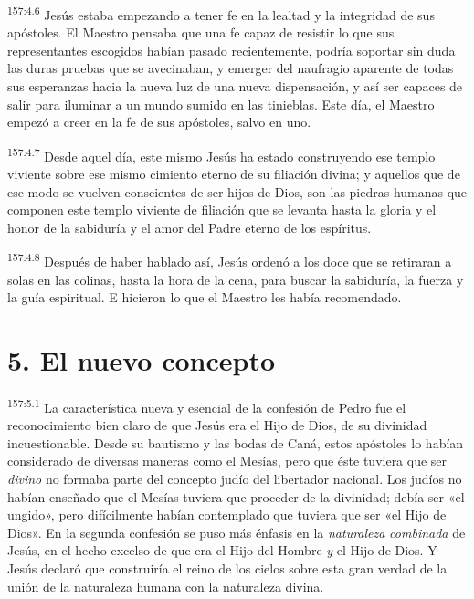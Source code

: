 \par 
\textsuperscript{157:4.6} Jesús estaba empezando a tener fe en la lealtad y la integridad de sus apóstoles. El Maestro pensaba que una fe capaz de resistir lo que sus representantes escogidos habían pasado recientemente, podría soportar sin duda las duras pruebas que se avecinaban, y emerger del naufragio aparente de todas sus esperanzas hacia la nueva luz de una nueva dispensación, y así ser capaces de salir para iluminar a un mundo sumido en las tinieblas. Este día, el Maestro empezó a creer en la fe de sus apóstoles, salvo en uno.

\par 
\textsuperscript{157:4.7} Desde aquel día, este mismo Jesús ha estado construyendo ese templo viviente sobre ese mismo cimiento eterno de su filiación divina; y aquellos que de ese modo se vuelven conscientes de ser hijos de Dios, son las piedras humanas que componen este templo viviente de filiación que se levanta hasta la gloria y el honor de la sabiduría y el amor del Padre eterno de los espíritus.

\par 
\textsuperscript{157:4.8} Después de haber hablado así, Jesús ordenó a los doce que se retiraran a solas en las colinas, hasta la hora de la cena, para buscar la sabiduría, la fuerza y la guía espiritual. E hicieron lo que el Maestro les había recomendado.

\section*{5. El nuevo concepto}
\par 
\textsuperscript{157:5.1} La característica nueva y esencial de la confesión de Pedro fue el reconocimiento bien claro de que Jesús era el Hijo de Dios, de su divinidad incuestionable. Desde su bautismo y las bodas de Caná, estos apóstoles lo habían considerado de diversas maneras como el Mesías, pero que éste tuviera que ser \textit{divino} no formaba parte del concepto judío del libertador nacional. Los judíos no habían enseñado que el Mesías tuviera que proceder de la divinidad; debía ser «el ungido», pero difícilmente habían contemplado que tuviera que ser «el Hijo de Dios». En la segunda confesión se puso más énfasis en la \textit{naturaleza} \textit{combinada} de Jesús, en el hecho excelso de que era el Hijo del Hombre \textit{y} el Hijo de Dios. Y Jesús declaró que construiría el reino de los cielos sobre esta gran verdad de la unión de la naturaleza humana con la naturaleza divina.

